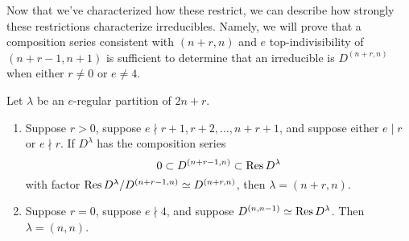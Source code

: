 \documentclass{amsart}
\begin{document}
  Now that we've characterized how these restrict, we can describe how strongly these restrictions characterize irreducibles.
  Namely, we will prove that a composition series consistent with $(n+r,n)$ and $e$ top-indivisibility of $(n+r-1,n+1)$ is sufficient to determine that an irreducible is $D^{(n+r,n)}$ when either $r \neq 0$ or $e \neq 4$.
  \begin{proposition}\label{Combinatorics}
    Let $\lambda$ be an $e$-regular partition of $2n + r$.
    \begin{enumerate}[label={(\roman*)}]
      \item Suppose $r > 0$, suppose $e \nmid r+1, r + 2,\dots,n + r + 1$, and suppose either $e \mid r$ or $e \nmid r$.
        If $D^\lambda$ has the composition series 
        \begin{equation}\label{D Composition Series}
          0 \subset D^{(n+r-1,n)} \subset \text{Res} \, D^{\lambda}
        \end{equation}
        with factor $\text{Res} \, D^{\lambda} / D^{(n+r-1,n)} \simeq D^{(n+r,n)}$, then $\lambda = (n+r,n)$.
      \item Suppose $r = 0$, suppose $e \nmid 4$, and suppose $D^{(n,n-1)} \simeq \text{Res} \, D^\lambda$.
        Then $\lambda = (n,n)$. 
    \end{enumerate}
  \end{proposition}
\end{document}
